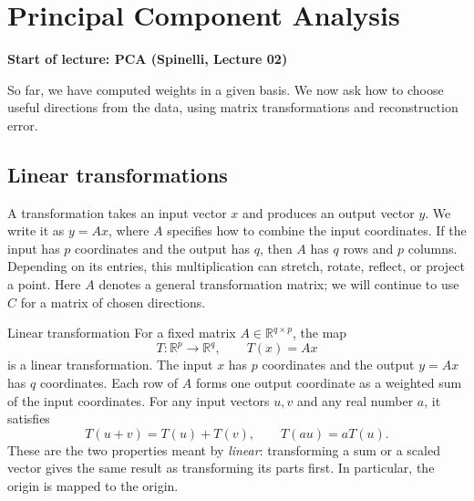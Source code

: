 \chapter{Principal Component Analysis}\label{chap:pca}

\begin{tcolorbox}[colback=yellow!20,colframe=yellow!60!black,
  boxrule=0.4pt,arc=1mm,left=5pt,right=5pt,top=3pt,bottom=3pt,
  before skip=0pt,after skip=0pt]
\small\textbf{Start of lecture: PCA (Spinelli, Lecture 02)}
\end{tcolorbox}

\smallskip
So far, we have computed weights in a given basis. We now ask how to
choose useful directions from the data, using matrix transformations
and reconstruction error.

\section{Linear transformations}

A transformation takes an input vector $x$ and produces an output
vector $y$. We write it as $y=Ax$, where $A$ specifies how to combine
the input coordinates. If the input has $p$ coordinates and the output
has $q$, then $A$ has $q$ rows and $p$ columns.
Depending on its entries, this multiplication can stretch, rotate,
reflect, or project a point. Here $A$ denotes a general transformation
matrix; we will continue to use $C$ for a matrix of chosen directions.

\begin{frameddefn}{Linear transformation}\label{def:linear-transformation}
For a fixed matrix $A\in\mathbb{R}^{q\times p}$, the map
\[
  T:\mathbb{R}^p\to\mathbb{R}^q,\qquad T(x)=Ax
\]
is a linear transformation. The input $x$ has $p$ coordinates and the
output $y=Ax$ has $q$ coordinates. Each row of $A$ forms one output
coordinate as a weighted sum of the input coordinates.
For any input vectors $u,v$ and any real number $a$, it satisfies
\[
  T(u+v)=T(u)+T(v),\qquad T(au)=aT(u).
\]
These are the two properties meant by \emph{linear}: transforming a
sum or a scaled vector gives the same result as transforming its
parts first. In particular, the origin is mapped to the origin.
\end{frameddefn}

